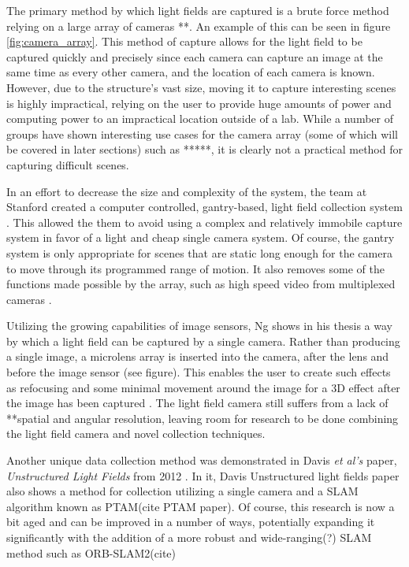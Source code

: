 \documentclass[12pt]{report}
\begin{document}
The primary method by which light fields are captured is a brute force method relying on a large array of cameras \cite{Ng06}**. An example of this can be seen in figure \ref{fig:camera_array}. This method of capture allows for the light field to be captured quickly and precisely since each camera can capture an image at the same time as every other camera, and the location of each camera is known. However, due to the structure's vast size, moving it to capture interesting scenes is highly impractical, relying on the user to provide huge amounts of power and computing power to an impractical location outside of a lab. While a number of groups have shown interesting use cases for the camera array (some of which will be covered in later sections) such as \cite{Ng06}*****, it is clearly not a practical method for capturing difficult scenes.

In an effort to decrease the size and complexity of the system, the team at Stanford created a computer controlled, gantry-based, light field collection system \cite{Koller04}. This allowed the them to avoid using a complex and relatively immobile capture system in favor of a light and cheap single camera system. Of course, the gantry system is only appropriate for scenes that are static long enough for the camera to move through its programmed range of motion. It also removes some of the functions made possible by the array, such as high speed video from multiplexed cameras \cite{Wilburn05}.

Utilizing the growing capabilities of image sensors, Ng shows in his thesis a way by which a light field can be captured by a single camera. Rather than producing a single image, a microlens array is inserted into the camera, after the lens and before the image sensor (see figure). This enables the user to create such effects as refocusing and some minimal movement around the image for a 3D effect after the image has been captured \cite{Ng06}. The light field camera still suffers from a lack of **spatial and angular resolution, leaving room for research to be done combining the light field camera and novel collection techniques.

Another unique data collection method was demonstrated in Davis \emph{et al's} paper, \emph{Unstructured Light Fields} from 2012 \cite{Davis12}. In it, Davis 
Unstructured light fields paper also shows a method for collection utilizing a single camera and a SLAM algorithm known as PTAM(cite PTAM paper). Of course, this research is now a bit aged and can be improved in a number of ways, potentially expanding it significantly with the addition of a more robust and wide-ranging(?) SLAM method such as ORB-SLAM2(cite)
\end{document}
